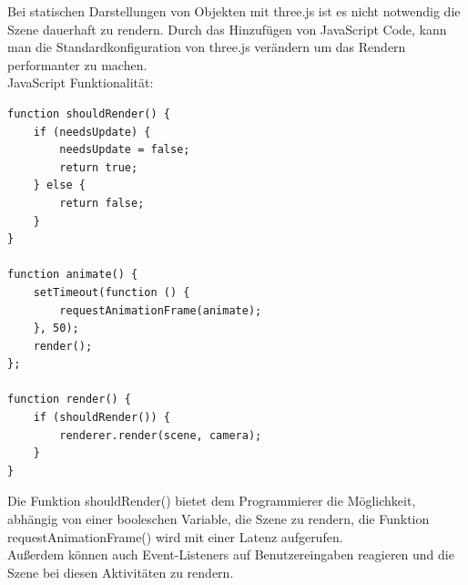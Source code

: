 Bei statischen Darstellungen von Objekten mit three.js ist es nicht notwendig die Szene dauerhaft zu rendern. Durch das Hinzufügen von JavaScript Code, kann man die Standardkonfiguration von three.js verändern um das Rendern performanter zu machen.
\\
JavaScript Funktionalität: 
\begin{lstlisting}
function shouldRender() {
    if (needsUpdate) {
        needsUpdate = false;
        return true;
    } else {
        return false;
    }
}

function animate() {
    setTimeout(function () {
        requestAnimationFrame(animate);
    }, 50);
    render();
};

function render() {
    if (shouldRender()) {
        renderer.render(scene, camera);
    }
}
\end{lstlisting}
Die Funktion shouldRender() bietet dem Programmierer die Möglichkeit, abhängig von einer booleschen Variable, die Szene zu rendern, die Funktion requestAnimationFrame() wird mit einer Latenz aufgerufen. \\
Außerdem können auch Event-Listeners auf Benutzereingaben reagieren und die Szene bei diesen Aktivitäten zu rendern. \cite{rendering_on_demand}

\clearpage

